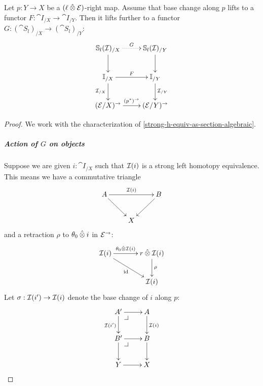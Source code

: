 \documentclass[reqno,10pt,a4paper,oneside]{amsart}
\begin{document}
\begin{lemma}
\label{strong-h-equiv-base-change-along-fibration}
Let $p : Y \to X$ be a $(\intervall \hatotimes \calE)$-right map.
Assume that base change along $p$ lifts to a functor $F : \cat{I}_{/X} \to \cat{I}_{/Y}$.
Then it lifts further to a functor $G : (\cat{S}_l)_{/X} \to (\cat{S}_l)_{/Y}$:
\[
\xymatrix{
  \cat{S}_l(\cal{I})_{/X}
  \ar@{.>}[r]^{G}
  \ar[d]
&
  \cat{S}_l(\cal{I})_{/Y}
  \ar[d]
\\
  \cat{I}_{/X}
  \ar[r]^{F}
  \ar[d]_{\cal{I}_{/X}}
&
  \cat{I}_{/Y}
  \ar[d]^{\cal{I}_{/Y}}
\\
  (\catE / X)^{\to}
  \ar[r]^{(p^*)^{\to}}
&
  (\catE / Y)^{\to}
}
\]
\end{lemma}

\begin{proof}
We work with the characterization of \cref{strong-h-equiv-as-section-algebraic}.

\hfill

\subparagraph{\textbf{Action of $G$ on objects}}

Suppose we are given $i : \cat{I}_{/X}$ such that $\cal{I}(i)$ is a strong left homotopy equivalence.
This means we have a commutative triangle
\[
\xymatrix{
  A
  \ar[rr]^{\cal{I}(i)}
  \ar[dr]
&&
  B
  \ar[dl]
\\&
  X
}
\]
and a retraction $\rho$ to $\thetal \hatotimes i$ in $\catE^{\to}$:
\[
\xymatrix@C+1em{
  \cal{I}(i)
  \ar[r]^-{\thetal \hatotimes \cal{I}(i)}
  \ar[dr]_{\id}
&
  \intervalr \hatotimes \cal{I}(i) \ar[d]^{\rho}
\\&
  \cal{I}(i)
}
\]
Let $\sigma : \cal{I}(i') \to \cal{I}(i)$ denote the base change of $i$ along $p$:
\[
\xymatrix{
  A'
  \ar[r]
  \ar[d]_{\cal{I}(i')}
  \pullback{dr}
&
  A
  \ar[d]^{\cal{I}(i)}
\\
  B'
  \ar[r]
  \ar[d]
  \pullback{dr}
&
  B
  \ar[d]
\\
  Y
  \ar[r]
&
  X
}
\]


\end{proof}
\end{document}

